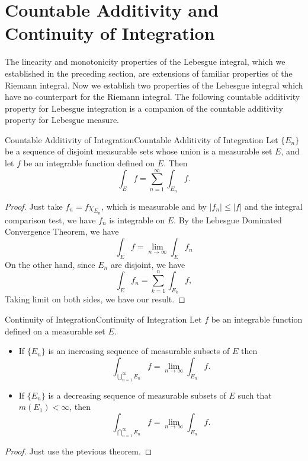 \documentclass[../main.tex]{subfiles}
\begin{document}
\section{Countable Additivity and Continuity of Integration}

The linearity and monotonicity properties of the Lebesgue integral, which we established in the preceding section, are extensions of familiar properties of the Riemann integral. Now we establish two properties of the Lebesgue integral which have no counterpart for the Riemann integral. The following countable additivity property for Lebesgue integration is a companion of the countable additivity property for Lebesgue measure.

\begin{theorem}{Countable Additivity of Integration}{Countable Additivity of Integration}
	Let $\{ E_n \}$ be a sequence of disjoint measurable sets whose union is a measurable set $E$, and let $f$ be an integrable function defined on $E$. Then
	\begin{equation}
		\int_E f = \sum_{n=1}^{\infty} \int_{E_n} f.
	\end{equation}
\end{theorem}
\begin{proof}
	Just take $f_n = f \chi_{E_n}$, which is measurable and by $|f_n| \leq |f|$ and the integral comparison test, we have $f_n$ is integrable on $E$. By the Lebesgue Dominated Convergence Theorem, we have
	\begin{equation*}
		\int_E f = \lim_{n \to \infty} \int_E f_n
	\end{equation*}
	On the other hand, since $E_n$ are disjoint, we have
	\begin{equation*}
		\int_E f_n = \sum_{k=1}^{n} \int_{E_k} f,
	\end{equation*}
	Taking limit on both sides, we have our result.
\end{proof}

\begin{theorem}{Continuity of Integration}{Continuity of Integration}
	Let $f$ be an integrable function defined on a measurable set $E$.
	\begin{itemize}
		\item If $\{ E_n \}$ is an increasing sequence of measurable subsets of $E$ then
			\begin{equation}
				\int_{\bigcup_{n=1}^{\infty} E_n} f = \lim_{n \to \infty} \int_{E_n} f.
			\end{equation}
		\item If $\{ E_n \}$ is a decreasing sequence of measurable subsets of $E$ such that $m(E_1) < \infty$, then
			\begin{equation}
				\int_{\bigcap_{n=1}^{\infty} E_n} f = \lim_{n \to \infty} \int_{E_n} f.
			\end{equation}
	\end{itemize}
\end{theorem}
\begin{proof}
	Just use the ptevious theorem.
\end{proof}
\end{document}
